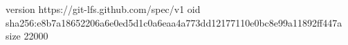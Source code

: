 version https://git-lfs.github.com/spec/v1
oid sha256:e8b7a18652206a6e0ed5d1c0a6eaa4a773dd12177110e0bc8e99a11892ff447a
size 22000
